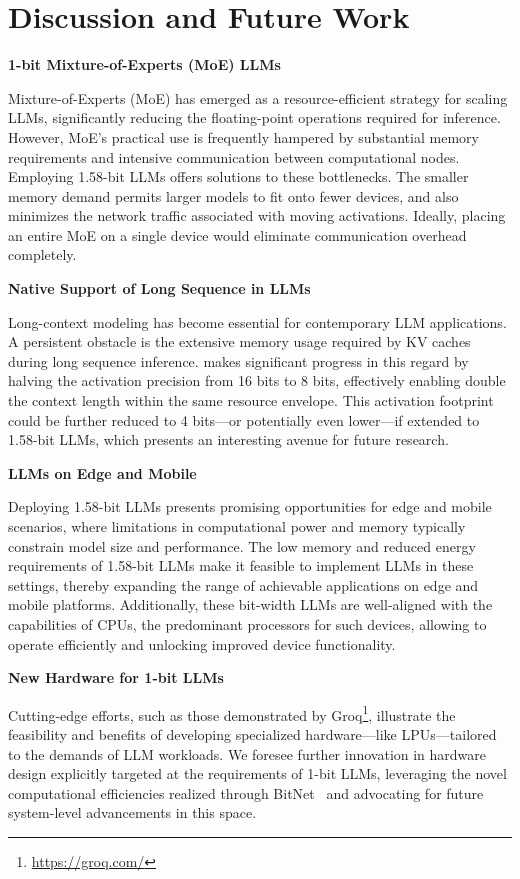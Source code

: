 \section{Discussion and Future Work}

\textbf{1-bit Mixture-of-Experts (MoE) LLMs}

Mixture-of-Experts (MoE) has emerged as a resource-efficient strategy for scaling LLMs, significantly reducing the floating-point operations required for inference. However, MoE's practical use is frequently hampered by substantial memory requirements and intensive communication between computational nodes. Employing 1.58-bit LLMs offers solutions to these bottlenecks. The smaller memory demand permits larger models to fit onto fewer devices, and also minimizes the network traffic associated with moving activations. Ideally, placing an entire MoE on a single device would eliminate communication overhead completely.

\textbf{Native Support of Long Sequence in LLMs}

Long-context modeling has become essential for contemporary LLM applications. A persistent obstacle is the extensive memory usage required by KV caches during long sequence inference.  makes significant progress in this regard by halving the activation precision from 16 bits to 8 bits, effectively enabling double the context length within the same resource envelope. This activation footprint could be further reduced to 4 bits—or potentially even lower—if extended to 1.58-bit LLMs, which presents an interesting avenue for future research.

\textbf{LLMs on Edge and Mobile}

Deploying 1.58-bit LLMs presents promising opportunities for edge and mobile scenarios, where limitations in computational power and memory typically constrain model size and performance. The low memory and reduced energy requirements of 1.58-bit LLMs make it feasible to implement LLMs in these settings, thereby expanding the range of achievable applications on edge and mobile platforms. Additionally, these bit-width LLMs are well-aligned with the capabilities of CPUs, the predominant processors for such devices, allowing  to operate efficiently and unlocking improved device functionality.

\textbf{New Hardware for 1-bit LLMs}

Cutting-edge efforts, such as those demonstrated by Groq\footnote{\url{https://groq.com/}}, illustrate the feasibility and benefits of developing specialized hardware—like LPUs—tailored to the demands of LLM workloads. We foresee further innovation in hardware design explicitly targeted at the requirements of 1-bit LLMs, leveraging the novel computational efficiencies realized through BitNet~\cite{bitnet} and advocating for future system-level advancements in this space.

